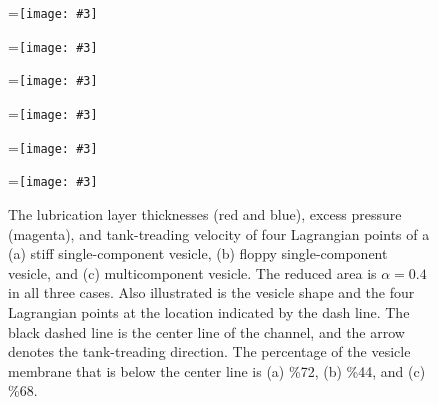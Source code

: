 \documentclass[twoside,twocolumn,9pt]{article}
\newcommand{\subfigimg}[3][,]{%
  \setbox1=\hbox{\texttt{[image: \#3]}}%
  \leavevmode\rlap{\usebox1}%
  \rlap{\hspace*{0pt}\raisebox{\dimexpr\ht1-0\baselineskip}{\bf
  \normalsize #2}}%
  \phantom{\usebox1}%
}
\begin{document}
\begin{figure}[t]
  \centering
  \subfigimg[width=0.3\linewidth]{(a)}{figures/Layer_Size_RAp4_SC.pdf}
  \subfigimg[width=0.3\linewidth]{(b)}{figures/Layer_Size_RAp4_SCp55.pdf}
  \subfigimg[width=0.3\linewidth]{(c)}{figures/Layer_Size_RAp4_MCp5.pdf}
  \subfigimg[width=0.3\linewidth,trim=0cm 6cm 28cm 0cm,clip=true]{}{figures/TankTreadingFigs_composite_SC.pdf}
  \subfigimg[width=0.3\linewidth,trim=0cm 6cm 28cm
  0cm,clip=true]{}{figures/TankTreadingFigs_composite_SCp55.pdf}
  \subfigimg[width=0.3\linewidth,trim=0cm 6cm 28cm
  0cm,clip=true]{}{figures/TankTreadingFigs_composite_MCp5.pdf}
  \caption{\label{fig:lubricationComposite} \small The lubrication layer
  thicknesses (red and blue), excess pressure (magenta), and
  tank-treading velocity of four Lagrangian points of a (a) stiff
  single-component vesicle, (b) floppy single-component vesicle, and (c)
  multicomponent vesicle. The reduced area is $\alpha = 0.4$ in all
  three cases. Also illustrated is the vesicle shape and the four
  Lagrangian points at the location indicated by the dash line. The
  black dashed line is the center line of the channel, and the arrow
  denotes the tank-treading direction. The percentage of the vesicle
  membrane that is below the center line is (a) \%72, (b) \%44, and (c)
  \%68.}
\end{figure}
\end{document}
